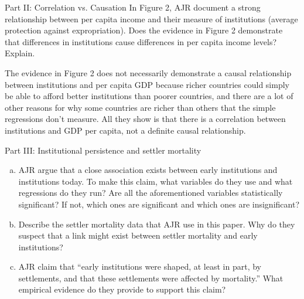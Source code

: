 \documentclass[8pt]{extarticle}
\begin{document}
  \begin{problem}{Part II: Correlation vs. Causation}
    In Figure 2, AJR document a strong relationship between per capita income and their measure of institutions (average protection against expropriation). Does the evidence in Figure 2 demonstrate that differences in institutions cause differences in per capita income levels? Explain.
  \end{problem}
  \begin{solution}
    The evidence in Figure 2 does not necessarily demonstrate a causal relationship between institutions and per capita GDP because richer countries could simply be able to afford better institutions than poorer countries, and there are a lot of other reasons for why some countries are richer than others that the simple regressions don't measure. All they show is that there is a correlation between institutions and GDP per capita, not a definite causal relationship.
  \end{solution}
  \begin{problem}{Part III: Institutional persistence and settler mortality}
    \begin{enumerate}[(a)]
      \item AJR argue that a close association exists between early institutions and institutions today. To make this claim, what variables do they use and what regressions do they run? Are all the aforementioned variables statistically significant? If not, which ones are significant and which ones are insignificant?
      \item Describe the settler mortality data that AJR use in this paper. Why do they suspect that a link might exist between settler mortality and early institutions?
      \item AJR claim that ``early institutions were shaped, at least in part, by settlements, and that these settlements were affected by mortality.'' What empirical evidence do they provide to support this claim?
    \end{enumerate}
  \end{problem}
\end{document}
